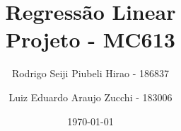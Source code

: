 \title{%
Regressão Linear \\
\large Projeto - MC613
}
\author{
    Rodrigo Seiji Piubeli Hirao - 186837
    \and
    Luiz Eduardo Araujo Zucchi - 183006
}
\date{\today}